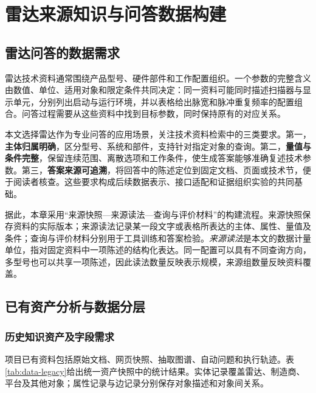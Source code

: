 \chapter{雷达来源知识与问答数据构建}
\label{chap:radar-data}

\section{雷达问答的数据需求}

雷达技术资料通常围绕产品型号、硬件部件和工作配置组织。一个参数的完整含义由数值、单位、适用对象和限定条件共同决定：同一资料可能同时描述扫描器与显示单元，分别列出启动与运行环境，并以表格给出脉宽和脉冲重复频率的配置组合。问答过程需要从这些资料中找到目标参数，同时保持原有的对应关系。

本文选择雷达作为专业问答的应用场景，关注技术资料检索中的三类要求。第一，\textbf{主体归属明确}，区分型号、系统和部件，支持针对指定对象的查询。第二，\textbf{量值与条件完整}，保留连续范围、离散选项和工作条件，使生成答案能够准确复述技术参数。第三，\textbf{答案来源可追溯}，将回答中的陈述定位到固定文档、页面或技术节，便于阅读者核查。这些要求构成后续数据表示、接口适配和证据组织实验的共同基础。

据此，本章采用“来源快照---来源读法---查询与评价材料”的构建流程。来源快照保存资料的实际版本；来源读法记录某一段文字或表格所表达的主体、属性、量值及条件；查询与评价材料分别用于工具训练和答案检验。\emph{来源读法}是本文的数据计量单位，指对固定资料中一项陈述的结构化表达。同一配置可以具有不同查询方向，多型号也可以共享一项陈述，因此读法数量反映表示规模，来源组数量反映资料覆盖。

\section{已有资产分析与数据分层}

\subsection{历史知识资产及字段需求}

项目已有资料包括原始文档、网页快照、抽取图谱、自动问题和执行轨迹。表\ref{tab:data-legacy}给出统一资产快照中的统计结果。实体记录覆盖雷达、制造商、平台及其他对象；属性记录与边记录分别保存对象描述和对象间关系。

\begin{table}[htbp]
\centering\small
\caption{历史知识资产统计}
\label{tab:data-legacy}
\DataLegacyInventoryTable
\end{table}


